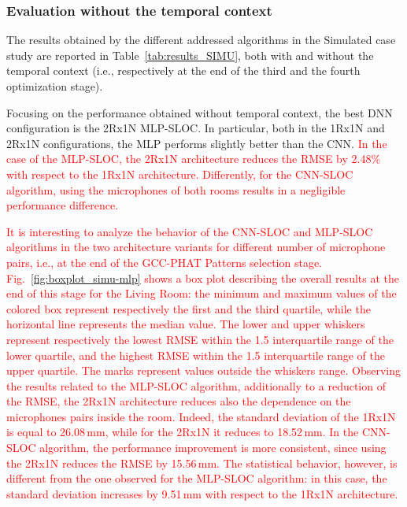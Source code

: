 \documentclass[review]{elsarticle}
\newcommand{\figref}[1]{Fig.~\ref{#1}}
\newcommand{\tableref}[1]{Table~\ref{#1}}
\begin{document}
\subsubsection{Evaluation without the temporal context}
The results obtained by the different addressed algorithms in the Simulated case study are reported in \tableref{tab:results_SIMU}, both with and without the temporal context (i.e., respectively at the end of the third and the fourth optimization stage).

Focusing on the performance obtained without temporal context, the best DNN configuration is the 2Rx1N MLP-SLOC. In particular, both in the 1Rx1N and  2Rx1N configurations, the MLP performs slightly better than the CNN. \textcolor{red}{ In the case of the MLP-SLOC, the 2Rx1N architecture reduces the RMSE by 2.48\%  with respect to the 1Rx1N architecture. Differently, for the CNN-SLOC algorithm, using the microphones of both rooms results in a negligible performance difference.}

\textcolor{red}{It is interesting to analyze the behavior of the CNN-SLOC and MLP-SLOC algorithms in the two architecture variants for different number of microphone pairs, i.e., at the end of the GCC-PHAT Patterns selection stage. \figref{fig:boxplot_simu-mlp} shows a box plot describing the overall results at the end of this stage for the Living Room: the minimum and maximum values of the colored box represent respectively the first and the third quartile, while the horizontal line represents the median value. The lower and upper whiskers represent respectively the lowest RMSE within the 1.5 interquartile range of the lower quartile, and the highest RMSE within the 1.5 interquartile range of the upper quartile. The marks represent values outside the whiskers range. %
Observing the results related to the MLP-SLOC algorithm, additionally to a reduction of the RMSE, the 2Rx1N architecture reduces also the dependence on the microphones pairs inside the room. Indeed, the standard deviation of the 1Rx1N is equal to 26.08\,mm, while for the 2Rx1N it reduces to 18.52\,mm. In the CNN-SLOC algorithm, the performance improvement is more consistent, since using the 2Rx1N reduces the RMSE by 15.56\,mm. The statistical behavior, however, is different from the one observed for the MLP-SLOC algorithm: in this case, the standard deviation increases by 9.51\,mm with respect to the 1Rx1N architecture.}
\end{document}

